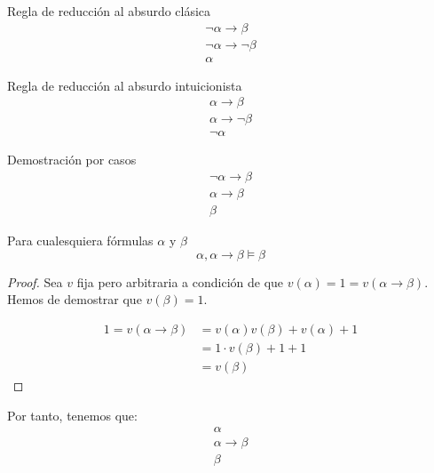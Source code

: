 \begin{ejemplo}
    Regla de reducción al absurdo clásica
    \begin{equation*}
        \begin{array}{c}
            \lnot\alpha\rightarrow\beta \\
            \lnot\alpha\rightarrow\lnot\beta \\
            \hline
            \alpha
        \end{array}
    \end{equation*}
\end{ejemplo}

\begin{ejemplo}
    Regla de reducción al absurdo intuicionista
    \begin{equation*}
        \begin{array}{c}
            \alpha\rightarrow\beta\\
            \alpha\rightarrow\lnot\beta \\
            \hline
            \lnot\alpha
        \end{array}
    \end{equation*}
\end{ejemplo}

\begin{ejemplo}
    Demostración por casos
    \begin{equation*}
        \begin{array}{c}
            \lnot\alpha\rightarrow\beta\\
            \alpha\rightarrow\beta\\
            \hline
            \beta
        \end{array}
    \end{equation*}
\end{ejemplo}

\begin{ejemplo}
    Para cualesquiera fórmulas $\alpha$ y $\beta$
    \begin{equation*}
        \alpha,\alpha\rightarrow\beta\vDash\beta
    \end{equation*}
\end{ejemplo}
\begin{proof}
    Sea $v$ fija pero arbitraria a condición de que $v(\alpha)=1=v(\alpha\rightarrow\beta)$. Hemos de demostrar que $v(\beta)=1$.

    \begin{align*}
        1=v(\alpha\rightarrow\beta)&=v(\alpha)v(\beta)+v(\alpha)+1 \\
                                 &=1\cdot v(\beta) + 1 + 1 \\
                                 &= v(\beta)
    \end{align*}
\end{proof}
Por tanto, tenemos que:
\begin{equation*}
    \begin{array}{c}
        \alpha\\
        \alpha\rightarrow\beta\\
        \hline
        \beta
    \end{array}
\end{equation*}

